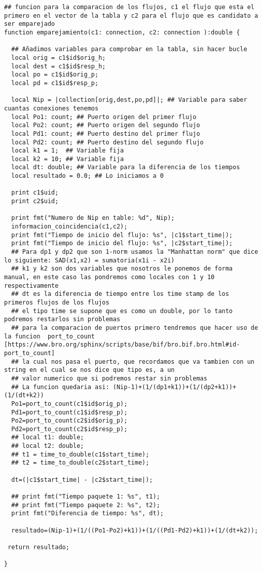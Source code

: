 \begin{lstlisting}[style=CodigoC]
## funcion para la comparacion de los flujos, c1 el flujo que esta el primero en el vector de la tabla y c2 para el flujo que es candidato a ser emparejado
function emparejamiento(c1: connection, c2: connection ):double {

  ## Añadimos variables para comprobar en la tabla, sin hacer bucle
  local orig = c1$id$orig_h;
  local dest = c1$id$resp_h;
  local po = c1$id$orig_p;
  local pd = c1$id$resp_p;

  local Nip = |collection[orig,dest,po,pd]|; ## Variable para saber cuantas conexiones tenemos
  local Po1: count; ## Puerto origen del primer flujo
  local Po2: count; ## Puerto origen del segundo flujo
  local Pd1: count; ## Puerto destino del primer flujo
  local Pd2: count; ## Puerto destino del segundo flujo
  local k1 = 1;  ## Variable fija
  local k2 = 10; ## Variable fija
  local dt: double; ## Variable para la diferencia de los tiempos
  local resultado = 0.0; ## Lo iniciamos a 0
  
  print c1$uid;
  print c2$uid;

  print fmt("Numero de Nip en table: %d", Nip);
  informacion_coincidencia(c1,c2);
  print fmt("Tiempo de inicio del flujo: %s", |c1$start_time|);
  print fmt("Tiempo de inicio del flujo: %s", |c2$start_time|);
  ## Para dp1 y dp2 que son 1-norm usamos la "Manhattan norm" que dice lo siguiente: SAD(x1,x2) = sumatoria(x1i - x2i)
  ## k1 y k2 son dos variables que nosotros le ponemos de forma manual, en este caso las pondremos como locales con 1 y 10 respectivamente
  ## dt es la diferencia de tiempo entre los time stamp de los primeros flujos de los flujos
  ## el tipo time se supone que es como un double, por lo tanto podremos restarlos sin problemas
  ## para la comparacion de puertos primero tendremos que hacer uso de la funcion  port_to_count [https://www.bro.org/sphinx/scripts/base/bif/bro.bif.bro.html#id-port_to_count]
  ## la cual nos pasa el puerto, que recordamos que va tambien con un string en el cual se nos dice que tipo es, a un
  ## valor numerico que si podremos restar sin problemas
  ## La funcion quedaria asi: (Nip-1)+(1/(dp1+k1))+(1/(dp2+k1))+(1/(dt+k2))
  Po1=port_to_count(c1$id$orig_p);
  Pd1=port_to_count(c1$id$resp_p);
  Po2=port_to_count(c2$id$orig_p);
  Pd2=port_to_count(c2$id$resp_p);
  ## local t1: double;
  ## local t2: double;
  ## t1 = time_to_double(c1$start_time);
  ## t2 = time_to_double(c2$start_time);

  dt=(|c1$start_time| - |c2$start_time|);

  ## print fmt("Tiempo paquete 1: %s", t1);
  ## print fmt("Tiempo paquete 2: %s", t2);
  print fmt("Diferencia de tiempo: %s", dt);

  resultado=(Nip-1)+(1/((Po1-Po2)+k1))+(1/((Pd1-Pd2)+k1))+(1/(dt+k2));

 return resultado;

}
\end{lstlisting}

